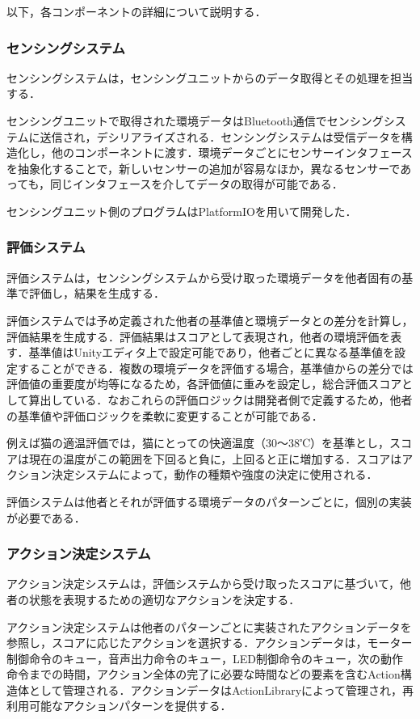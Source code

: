 \documentclass{cuxarticle}
\begin{document}
以下，各コンポーネントの詳細について説明する．

\subsubsection{センシングシステム}
センシングシステムは，センシングユニットからのデータ取得とその処理を担当する．

センシングユニットで取得された環境データはBluetooth通信でセンシングシステムに送信され，デシリアライズされる．センシングシステムは受信データを構造化し，他のコンポーネントに渡す．環境データごとにセンサーインタフェースを抽象化することで，新しいセンサーの追加が容易なほか，異なるセンサーであっても，同じインタフェースを介してデータの取得が可能である．

センシングユニット側のプログラムはPlatformIOを用いて開発した．

\subsubsection{評価システム}
評価システムは，センシングシステムから受け取った環境データを他者固有の基準で評価し，結果を生成する．

評価システムでは予め定義された他者の基準値と環境データとの差分を計算し，評価結果を生成する．評価結果はスコアとして表現され，他者の環境評価を表す．基準値はUnityエディタ上で設定可能であり，他者ごとに異なる基準値を設定することができる．複数の環境データを評価する場合，基準値からの差分では評価値の重要度が均等になるため，各評価値に重みを設定し，総合評価スコアとして算出している．なおこれらの評価ロジックは開発者側で定義するため，他者の基準値や評価ロジックを柔軟に変更することが可能である．

例えば猫の適温評価では，猫にとっての快適温度（30～38℃）を基準とし，スコアは現在の温度がこの範囲を下回ると負に，上回ると正に増加する．スコアはアクション決定システムによって，動作の種類や強度の決定に使用される．

評価システムは他者とそれが評価する環境データのパターンごとに，個別の実装が必要である．

\subsubsection{アクション決定システム}
アクション決定システムは，評価システムから受け取ったスコアに基づいて，他者の状態を表現するための適切なアクションを決定する．

アクション決定システムは他者のパターンごとに実装されたアクションデータを参照し，スコアに応じたアクションを選択する．アクションデータは，モーター制御命令のキュー，音声出力命令のキュー，LED制御命令のキュー，次の動作命令までの時間，アクション全体の完了に必要な時間などの要素を含むAction構造体として管理される．アクションデータはActionLibraryによって管理され，再利用可能なアクションパターンを提供する．
\end{document}
